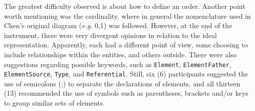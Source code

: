 \documentclass[a4paper,twoside,anonymous]{article}
\begin{document}
The greatest difficulty observed is about how to define an order.
Another point worth mentioning was the cardinality, where in general the nomenclature used in Chen's original diagram (\textit{e.g.} 0,1) was followed.
However, at the end of the instrument, there were very divergent opinions in relation to the ideal representation.
Apparently, each had a different point of view, some choosing to include relationships within the entities, and others outside.
There were also suggestions regarding possible keywords, such as \texttt{Element}, \texttt{ElementFather}, \texttt{ElementSource}, \texttt{Type}, and \texttt{Referential}.
Still, six (6) participants suggested the use of semicolons (;) to separate the declarations of elements, and all thirteen (13) recommended the use of symbols such as parentheses, brackets and/or keys to group similar sets of elements.
\end{document}
